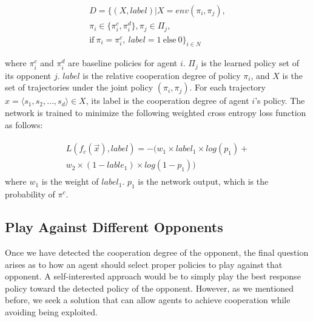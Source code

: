 \documentclass{article}
\begin{document}
\begin{equation}
\begin{split}
D = \{(X, label) | X = env(\pi_i,\pi_j),\\
\pi_i \in \{\pi_i^c, \pi_i^d\},\pi_j \in \Pi_j,\\
\mbox{if} \ \pi_i = \pi_i^c, \ label = 1 \ \mbox{else} \ 0 \}_{i \in N}
\end{split}
\end{equation}

where $\pi_i^c$ and $\pi_i^d$ are baseline policies for agent $i$. $\Pi_j$ is the learned policy set of its opponent $j$. $label$ is the relative cooperation degree of policy $\pi_i$, and $X$ is the set of trajectories under the joint policy $(\pi_i,\pi_j)$. For each trajectory $x = \langle s_1,s_2,\ldots,s_d \rangle \in X$, its label is the cooperation degree of agent $i$'s policy. The network is trained to minimize the following weighted cross entropy loss function as follows:

\begin{eqnarray}
\label{cd}
\begin{split}
L(f_c(\vec x),label) = - (w_1 \times label_1 \times log(p_1) + \\
w_2 \times (1 - lable_1) \times log(1 - p_1))
\end{split}
\end{eqnarray}
where $w_1$ is the weight of $label_1$. $p_1$ is the network output, which is the probability of $\pi^c$.

\subsection{Play Against Different Opponents}
Once we have detected the cooperation degree of the opponent, the final question arises as to how an agent should select proper policies to play against that opponent.  A self-interested approach would be to simply play the best response policy toward the detected policy of the opponent. However, as we mentioned before, we seek a
solution that can allow agents to achieve cooperation while avoiding being exploited.
\end{document}
